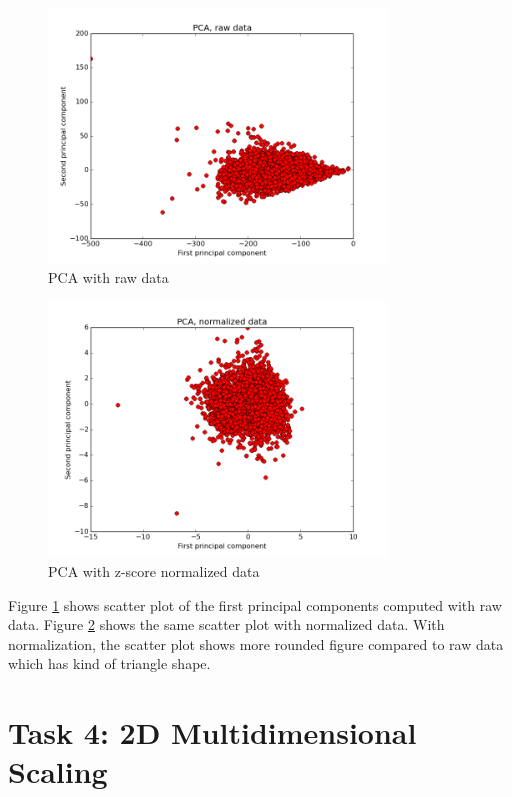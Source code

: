\documentclass[12pt]{article}
\begin{document}
\begin{figure}[H]
    \centering
    \includegraphics[width=0.8\textwidth]{pca_raw}
    \caption{PCA with raw data}
    \label{fig:pca_raw}
\end{figure}

\begin{figure}[H]
    \centering
    \includegraphics[width=0.8\textwidth]{pca_normalized}
    \caption{PCA with z-score normalized data}
    \label{fig:pca_normalized}
\end{figure}

Figure \ref{fig:pca_raw} shows scatter plot of the first principal components computed with raw data. Figure \ref{fig:pca_normalized} shows the same scatter plot with normalized data. With normalization, the scatter plot shows more rounded figure compared to raw data which has kind of triangle shape.

\section{Task 4: 2D Multidimensional Scaling}
\end{document}
